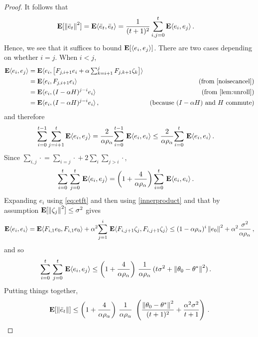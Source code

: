 \begin{proof}
It follows that 
\begin{align*}
\E[\norm{\eb_t}^2]&=\E\ip{\eb_t,\eb_t}
 =\frac{1}{(t+1)^2} \sum_{i,j=0}^t \E\ip{e_i,e_j}\,.
\end{align*}
Hence, we see that it suffices to bound $\EE{\ip{ e_i,  e_j }}$.
There are two cases depending on whether $i=j$. When $i< j$,
\begin{align*}
\E\ip{e_i,e_j}
&=\E \ip{e_i,\big[F_{j,i+1} e_i+\alpha\textstyle\sum_{k=i+1}^j F_{j,k+1}\zeta_{k}\big]}\\
&=\E\ip{e_i,F_{j,i+1} e_i} & \text{(from \cref{noisecancel})}\\
&=\E\ip{e_i, (I-\alpha H)^{j-i} e_i} & \text{(from \cref{lem:unroll})}\\
&=\E\ip{e_i,(I-\alpha H)^{j-i}e_i}\,, &\text{(because $(I-\alpha H)$ and $H$ commute)}
\end{align*}
and therefore
\begin{align*}
\label{inter}
\sum_{i=0}^{t-1}\sum_{j=i+1}^t \E\ip{ e_i,e_j}
&=\frac2{\alpha\rho_{\alpha}} \ous{\sum}{i=0}{t-1}\E\ip{e_i,e_i}
\leq \frac2{\alpha\rho_{\alpha}}\ous{\sum}{i=0}{t}\E\ip{e_i, e_i}\,.
\end{align*}
Since $\sum_{i,j}\cdot{} = \sum_{i=j}\cdot{} + 2 \sum_i \sum_{j>i} \cdot{}$,
\begin{align*}
\ous{\sum}{i=0}{t}\ous{\sum}{j=0}{t} \E\ip{e_i,e_j}&= \left(1+\frac4{\alpha\rho_{\alpha}}\right)\ous{\sum}{i=0}{t}\E\ip{e_i,e_i}\,.
\end{align*}
Expanding $e_i$ using \eqref{eq:etft} and then using \cref{innerproduct} and that by assumption $\EE{ \norm{\zeta_j}^2 } \le \sigma^2$ gives
\begin{align*}
\E\ip{e_i,e_i}=\E\ip{F_{i,1}e_0,F_{i,1}e_0}+\alpha^2\ous{\sum}{j=1}{i}\E\ip{ F_{i,j+1}\zeta_j, F_{i,j+1}\zeta_j}
\leq (1-\alpha\rho_{\alpha})^i\norm{e_0}^2+ \alpha^2\frac{\sigma^2}{\alpha \rho_\alpha}\,,
\end{align*}
and so
\begin{align*}
\ous{\sum}{i=0}{t}\ous{\sum}{j=0}{t} \E\ip{e_i,e_j}
&\leq \left(1+\frac4{\alpha\rho_{\alpha}}\right)\, \frac1{\alpha\rho_{\alpha}}\, (t\sigma^2+\norm{\theta_0-\ts}^2)\,.
\end{align*}
Putting things together,
\begin{align}
\E[\norm{\eb_t}]
\leq \left(1+\frac4{\alpha\rho_{\alpha}}\right)\, \frac1{\alpha\rho_{\alpha}}\, \,
		\left(\frac{\norm{\theta_0-\ts}^2}{(t+1)^2}+ \frac{\alpha^2\sigma^2}{t+1} \right)\,.
\end{align}
\end{proof}

